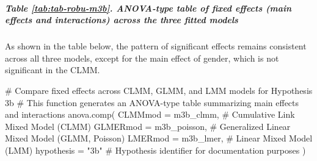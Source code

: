 \documentclass[
  bookmarksnumbered]{article}
\newenvironment{Shaded}{\begin{snugshade}}{\end{snugshade}}
\newcommand{\AttributeTok}[1]{\textcolor[rgb]{0.80,0.80,0.80}{#1}}
\newcommand{\CommentTok}[1]{\textcolor[rgb]{0.50,0.62,0.50}{#1}}
\newcommand{\FunctionTok}[1]{\textcolor[rgb]{0.94,0.94,0.56}{#1}}
\newcommand{\NormalTok}[1]{\textcolor[rgb]{0.80,0.80,0.80}{#1}}
\newcommand{\StringTok}[1]{\textcolor[rgb]{0.80,0.58,0.58}{#1}}
\begin{document}
\subparagraph{Table \ref{tab:tab-robu-m3b}. ANOVA-type table of fixed effects (main effects and interactions) across the three fitted models}\label{table-reftabtab-robu-m3b.-anova-type-table-of-fixed-effects-main-effects-and-interactions-across-the-three-fitted-models}

As shown in the table below, the pattern of significant effects remains consistent across all three models, except for the main effect of gender, which is not significant in the CLMM.

\begin{Shaded}
\begin{Highlighting}[]
\CommentTok{\# Compare fixed effects across CLMM, GLMM, and LMM models for Hypothesis 3b}
\CommentTok{\# This function generates an ANOVA{-}type table summarizing main effects and interactions}
\FunctionTok{anova.comp}\NormalTok{(}
  \AttributeTok{CLMMmod =}\NormalTok{ m3b\_clmm, }\CommentTok{\# Cumulative Link Mixed Model (CLMM)}
  \AttributeTok{GLMERmod =}\NormalTok{ m3b\_poisson, }\CommentTok{\# Generalized Linear Mixed Model (GLMM, Poisson)}
  \AttributeTok{LMERmod =}\NormalTok{ m3b\_lmer, }\CommentTok{\# Linear Mixed Model (LMM)}
  \AttributeTok{hypothesis =} \StringTok{"3b"} \CommentTok{\# Hypothesis identifier for documentation purposes}
\NormalTok{)}
\end{Highlighting}
\end{Shaded}
\end{document}
